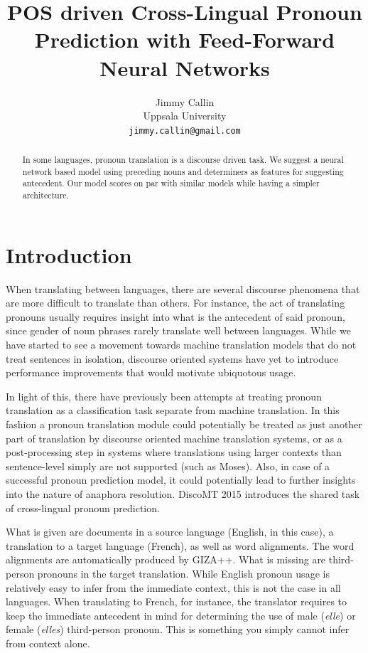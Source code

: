 \documentclass[11pt]{article}
\title{POS driven Cross-Lingual Pronoun Prediction with Feed-Forward Neural Networks}
\author{Jimmy Callin \\
  Uppsala University \\
  {\tt jimmy.callin@gmail.com}}
\date{}
\begin{document}
\maketitle
\begin{abstract}
    In some languages, pronoun translation is a discourse driven task. We suggest a neural network based model using preceding nouns and determiners as features for suggesting antecedent. Our model scores on par with similar models while having a simpler architecture.
\end{abstract}


\section{Introduction}

When translating between languages, there are several discourse phenomena that are more difficult to translate than others.
For instance, the act of translating pronouns usually requires insight into what is the antecedent of said pronoun, since gender of noun phrases rarely translate well between languages.
While we have started to see a movement towards machine translation models that do not treat sentences in isolation, discourse oriented systems have yet to introduce performance improvements that would motivate ubiquotous usage.

In light of this, there have previously been attempts at treating pronoun translation as a classification task separate from machine translation.
In this fashion a pronoun translation module could potentially be treated as just another part of translation by discourse oriented machine translation systems, or as a post-processing step in systems where translations using larger contexts than sentence-level simply are not supported (such as Moses).
Also, in case of a successful pronoun prediction model, it could potentially lead to further insights into the nature of anaphora resolution.
DiscoMT 2015 introduces the shared task of cross-lingual pronoun prediction.

What is given are documents in a source language (English, in this case), a translation to a target language (French), as well as word alignments.
The word alignments are automatically produced by GIZA++.
What is missing are third-person pronouns in the target translation.
While English pronoun usage is relatively easy to infer from the immediate context, this is not the case in all languages.
When translating to French, for instance, the translator requires to keep the immediate antecedent in mind for determining the use of male (\emph{elle}) or female (\emph{elles}) third-person pronoun.
This is something you simply cannot infer from context alone.
\end{document}
